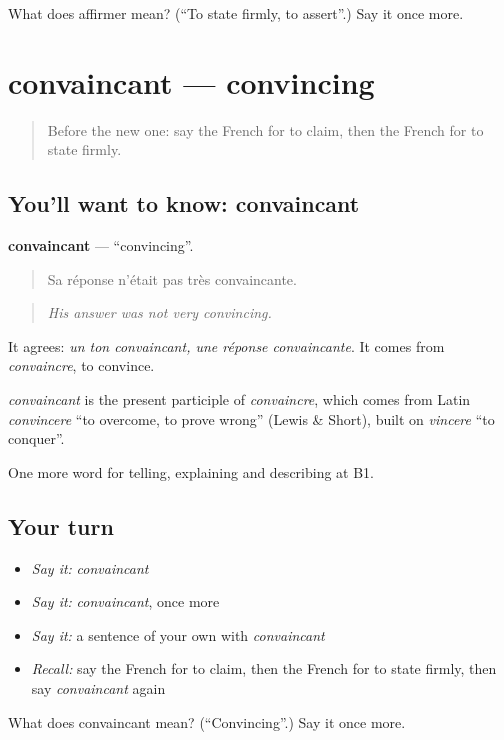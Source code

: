 \begin{tcolorbox}[breakable,colback=teal!4,colframe=teal!35!black,title={Before you move on}]
What does affirmer mean? (\textquotedblleft{}To state firmly, to assert\textquotedblright{}.) Say it once more.
\end{tcolorbox}
\section[convaincant]{convaincant — convincing}

\label{lesson:FR-C334-convaincant}



\begin{quote}
Before the new one: say the French for to claim, then the French for to state firmly.
\end{quote}

\subsection*{You'll want to know: convaincant}
\textbf{convaincant} — \textquotedblleft{}convincing\textquotedblright{}.

\begin{quote}
Sa réponse n'était pas très convaincante.
\end{quote}

\begin{quote}
\emph{His answer was not very convincing.}
\end{quote}

It agrees: \emph{un ton convaincant, une réponse convaincante}. It comes from \emph{convaincre}, to convince.

\begin{cousinweb}
\emph{convaincant} is the present participle of \emph{convaincre}, which comes from Latin \emph{convincere} \textquotedblleft{}to overcome, to prove wrong\textquotedblright{} (Lewis \& Short), built on \emph{vincere} \textquotedblleft{}to conquer\textquotedblright{}.
\end{cousinweb}

\begin{grammarlens}[title={What you've built}]
One more word for telling, explaining and describing at B1.
\end{grammarlens}

\subsection*{Your turn}
\begin{itemize}
\raggedright
  \item \emph{Say it:} \emph{convaincant}
  \item \emph{Say it:} \emph{convaincant}, once more
  \item \emph{Say it:} a sentence of your own with \emph{convaincant}
  \item \emph{Recall:} say the French for to claim, then the French for to state firmly, then say \emph{convaincant} again
\end{itemize}

\begin{tcolorbox}[breakable,colback=teal!4,colframe=teal!35!black,title={Before you move on}]
What does convaincant mean? (\textquotedblleft{}Convincing\textquotedblright{}.) Say it once more.
\end{tcolorbox}
